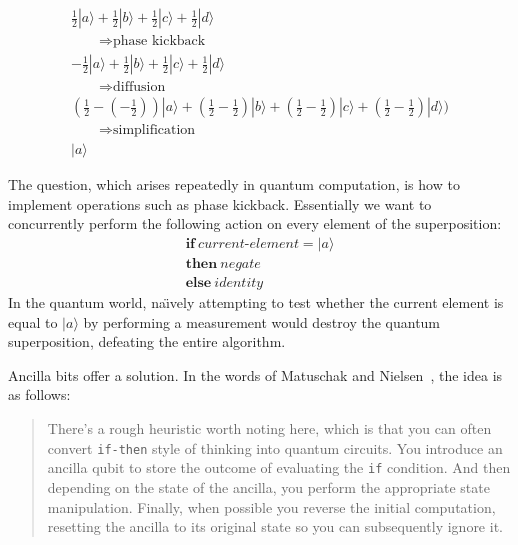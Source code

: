 \documentclass[sigplan,10pt,review,anonymous]{acmart}
\newcommand{\ket}[1]{|#1\rangle}
\begin{document}
\[\begin{array}{l}
\frac{1}{2}\ket{a}+\frac{1}{2}\ket{b}+\frac{1}{2}\ket{c}+\frac{1}{2}\ket{d}\\ [1.5ex]
\qquad\Rightarrow  \textrm{phase kickback} \\ [1.5ex]
-\frac{1}{2}\ket{a}+\frac{1}{2}\ket{b}+\frac{1}{2}\ket{c}+\frac{1}{2}\ket{d}\\ [1.5ex]
\qquad\Rightarrow  \textrm{diffusion} \\ [1.5ex]
 (\frac{1}{2}-(-\frac{1}{2}))\ket{a}+(\frac{1}{2}-\frac{1}{2})\ket{b}+(\frac{1}{2}-\frac{1}{2})\ket{c}+(\frac{1}{2}-\frac{1}{2})\ket{d})\\ [1.5ex]
\qquad\Rightarrow  \textrm{simplification} \\ [1.5ex]
\ket{a}
\end{array}\]

The question, which arises repeatedly in quantum computation, is how
to implement operations such as phase kickback. Essentially we want to
concurrently perform the following action on every element of the
superposition:
\[\begin{array}{l}
  \textbf{if}~\textit{current-element}=\ket{a} \\
  \textbf{then}~\textit{negate} \\
  \textbf{else}~\textit{identity}
\end{array}\]
In the quantum world, na\"\i vely attempting to test whether the
current element is equal to $\ket{a}$ by performing a measurement would
destroy the quantum superposition, defeating the entire algorithm.

Ancilla bits offer a solution.  In the words of
Matuschak and Nielsen~\cite{howgrover}, the idea is as follows:
\begin{quote}
  There's a rough heuristic worth noting here, which is that you can
  often convert \verb|if-then| style of thinking into quantum
  circuits. You introduce an ancilla qubit to store the outcome of
  evaluating the \verb|if| condition. And then depending on the state
  of the ancilla, you perform the appropriate state
  manipulation. Finally, when possible you reverse the initial
  computation, resetting the ancilla to its original state so you can
  subsequently ignore it.
\end{quote}
\end{document}
